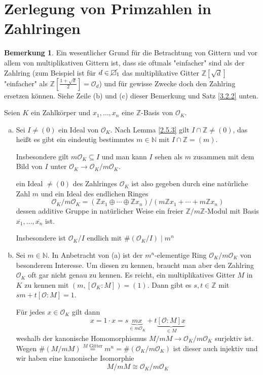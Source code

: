 \documentclass[
twoside=semi,
fontsize=12,
DIV=12, 
cleardoublepage=current,
leqno,
headings=optiontoheadandtoc, 
toc=idx
]{scrbook}
\newcommand{\N}{\mathbb{N}}
\newcommand{\Z}{\mathbb{Z}}
\newcommand{\nsquare}{\cancel{\square}}
\theoremstyle{definition}
\newtheorem{bemerkung}[definition]{Bemerkung}
\begin{document}
	\section{Zerlegung von Primzahlen in Zahlringen}\thispagestyle{sectionstart}
	
	\begin{bemerkung}\label{3.2.1}\hfill\newline
		Ein wesentlicher Grund f\"ur die Betrachtung von Gittern und vor allem von multiplikativen Gittern ist, dass sie oftmals "einfacher" sind als der Zahlring (zum Beispiel ist f\"ur $d \in \nsquare_{1}$ das multiplikative Gitter $\Z[\sqrt{d}]$ "einfacher" als $\Z[\frac{1+\sqrt{d}}{2}] = \mathcal{O}_d$) und f\"ur gewisse Zwecke doch den Zahlring ersetzen k\"onnen.
		Siehe Zeile (b) und (c) dieser Bemerkung und Satz \ref{3.2.2} unten.
		
		Seien $K$ ein Zahlk\"orper und $x_1, \dots, x_n$ eine $\Z$-Basis von $\mathcal{O}_K$.
		\begin{enumerate}[(a)]
			\item Sei $I \neq (0)$ ein Ideal von $\mathcal{O}_K$. Nach Lemma \ref{2.5.3} gilt $I \cap \Z \neq (0)$, das hei\ss t es gibt ein eindeutig bestimmtes $m \in \N$ mit $I \cap \Z = (m)$.
			
			Insbesondere gilt $m \mathcal{O}_K \subseteq I$ und man kann $I$ sehen als $m$ zusammen mit dem Bild von $I$ unter $\mathcal{O}_K \to \mathcal{O}_K/m\mathcal{O}_K$.
			
			ein Ideal $\neq (0)$ des Zahlringes $\mathcal{O}_K$ ist also gegeben durch eine nat\"urliche Zahl $m$ und ein Ideal des endlichen Ringes 
			\[\mathcal{O}_K/m\mathcal{O}_K = (\Z x_1 \oplus \cdots \oplus \Z x_n) / (m\Z x_1 + \cdots + m\Z x_n)\]
			dessen additive Gruppe in nat\"urlicher Weise ein freier $\Z/m\Z$-Modul mit Basis $\overline{x_1}, \dots, \overline{x_n}$ ist.
			
			Insbesondere ist $\mathcal{O}_K /I$ endlich mit $\#(\mathcal{O}_K / I) \mid m^n$
			
			\item Sei $m \in \N$. In Anbetracht von (a) ist der $m^n$-elementige Ring $\mathcal{O}_K/m\mathcal{O}_K$ von besonderem Interesse. Um diesen zu kennen, braucht man aber den
			Zahlring $\mathcal{O}_K$ oft gar nicht genau zu kennen. Es reicht, ein multiplikatives Gitter $M$ in $K$ zu kennen mit $(m, [\mathcal{O}_K:M]) = (1)$. Dann gibt es $s, t \in \Z$ mit 
			$sm + t[\mathcal{O}:M] = 1$.
			
			\noindent F\"ur jedes $x \in \mathcal{O}_K$ gilt dann
				\[x = 1 \cdot x = s \underbrace{mx}_{\in m\mathcal{O}_K} + t\underbrace{[\mathcal{O}:M]x}_{\in M}\]		
			weshalb der kanonische Homomorphismus $M/mM \to \mathcal{O}_K/m\mathcal{O}_K$ surjektiv ist. Wegen $\#(M/mM) \overset{M \textrm{ Gitter}}{=} m^n = \#(\mathcal{O}_K/m\mathcal{O}_K)$ ist dieser auch injektiv und wir haben eine kanonische Isomorphie
				\[M/mM \cong \mathcal{O}_K/m\mathcal{O}_K\]
				

\end{enumerate}
\end{bemerkung}
\end{document}
